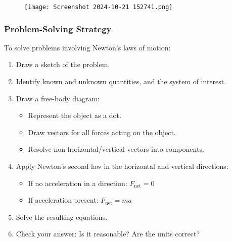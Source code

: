 \documentclass{beamer}
\begin{document}
\begin{frame}
\begin{figure}
    \centering
    \texttt{[image: Screenshot 2024-10-21 152741.png]}
\end{figure}
\end{frame}

\begin{frame}
\frametitle{Problem-Solving Strategy}
To solve problems involving Newton's laws of motion:
\begin{enumerate}
    \item Draw a sketch of the problem.
    \item Identify known and unknown quantities, and the system of interest.
    \item Draw a free-body diagram:
    \begin{itemize}
        \item Represent the object as a dot.
        \item Draw vectors for all forces acting on the object.
        \item Resolve non-horizontal/vertical vectors into components.
    \end{itemize}
    \item Apply Newton's second law in the horizontal and vertical directions:
    \begin{itemize}
        \item If no acceleration in a direction: $F_{\text{net}} = 0$
        \item If acceleration present: $F_{\text{net}} = ma$
    \end{itemize}
    \item Solve the resulting equations.
    \item Check your answer: Is it reasonable? Are the units correct?
\end{enumerate}
\end{frame}
\end{document}
